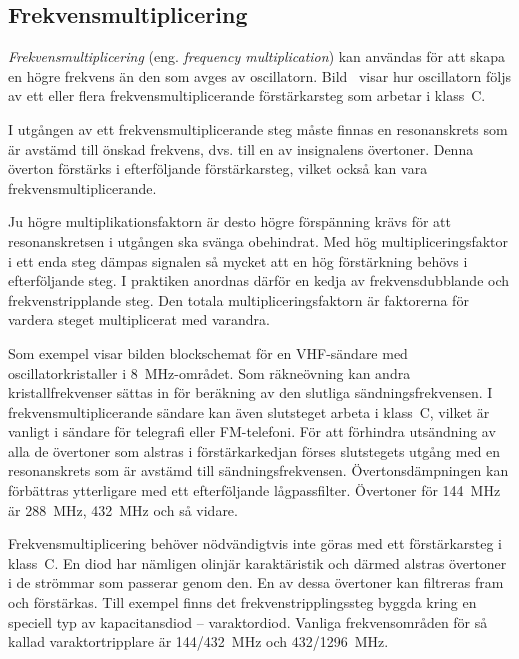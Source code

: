 \subsection{Frekvensmultiplicering}


\emph{Frekvensmultiplicering} (eng. \emph{frequency multiplication}) kan
användas för att skapa en högre frekvens än den som avges av oscillatorn.
Bild~ visar hur oscillatorn följs av ett eller flera
frekvensmultiplicerande förstärkarsteg som arbetar i klass~C.

I utgången av ett frekvensmultiplicerande steg måste finnas en resonanskrets som
är avstämd till önskad frekvens, dvs. till en av insignalens övertoner.
Denna överton förstärks i efterföljande förstärkarsteg, vilket också kan vara
frekvensmultiplicerande.

Ju högre multiplikationsfaktorn är desto högre förspänning krävs för
att resonanskretsen i utgången ska svänga obehindrat.
Med hög multipliceringsfaktor i ett enda steg dämpas signalen så mycket att
en hög förstärkning behövs i efterföljande steg.
I praktiken anordnas därför en kedja av frekvensdubblande och
frekvenstripplande steg.
Den totala multipliceringsfaktorn är faktorerna för vardera steget
multiplicerat med varandra.

Som exempel visar bilden blockschemat för en VHF-sändare med
oscillatorkristaller i \qty{8}{\mega\hertz}-området.
Som räkneövning kan andra kristallfrekvenser sättas in för beräkning av den
slutliga sändningsfrekvensen.
I frekvensmultiplicerande sändare kan även slutsteget arbeta i klass~C, vilket
är vanligt i sändare för telegrafi eller FM-telefoni.
För att förhindra utsändning av alla de övertoner som alstras i
förstärkarkedjan förses slutstegets utgång med en resonanskrets som är
avstämd till sändningsfrekvensen.
Övertonsdämpningen kan förbättras ytterligare med ett efterföljande
lågpassfilter.
Övertoner för \qty{144}{\mega\hertz} är \qty{288}{\mega\hertz},
\qty{432}{\mega\hertz} och så vidare.

Frekvensmultiplicering behöver nödvändigtvis inte göras med ett förstärkarsteg
i klass~C.
En diod har nämligen olinjär karaktäristik och därmed alstras övertoner i
de strömmar som passerar genom den.
En av dessa övertoner kan filtreras fram och förstärkas.
Till exempel finns det frekvenstripplingssteg byggda kring en speciell typ av
kapacitansdiod -- varaktordiod.
Vanliga frekvensområden för så kallad varaktortripplare är
144/\qty{432}{\mega\hertz} och 432/\qty{1296}{\mega\hertz}.

